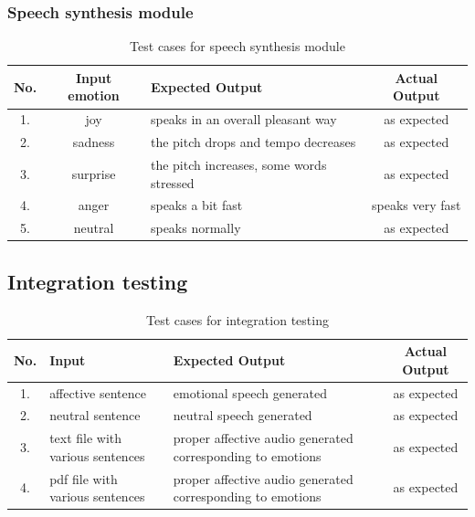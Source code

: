 \documentclass[oneside,a4paper,12pt]{book}
\begin{document}
\subsubsection{Speech synthesis module}
\begin{table}[!htbp]
	\def\arraystretch{1.5}
	\begin{tabularx}{\textwidth}{|c|c|X|c|}
		\hline 
		No. & Input emotion	& Expected Output & Actual Output \\ \hline
		1. & joy& speaks in an overall pleasant way & as expected \\ \hline
		2. & sadness & the pitch drops and tempo decreases & as expected \\ \hline
		3. & surprise & the pitch increases, some words stressed & as expected \\ \hline
		4. & anger & speaks a bit fast & speaks very fast \\ \hline
		5. & neutral & speaks normally & as expected \\ \hline
	\end{tabularx}
	\caption{Test cases for speech synthesis module}
	\label{tab:testcases}
\end{table}

\subsection{Integration testing}
\begin{table}[!htbp]
	\def\arraystretch{1.5}
	\begin{tabularx}{\textwidth}{|c|X|X|c|}
		\hline 
		No. & Input	& Expected Output & Actual Output \\ \hline
		1. & affective sentence & emotional speech generated & as expected \\ \hline
		2. & neutral sentence & neutral speech generated & as expected \\ \hline
		3. & text file with various sentences & proper affective audio generated corresponding to emotions & as expected \\ \hline
		4. & pdf file with various sentences & proper affective audio generated corresponding to emotions & as expected \\ \hline
	\end{tabularx}
	\caption{Test cases for integration testing}
	\label{tab:testcases}
\end{table}

\newpage
\end{document}
